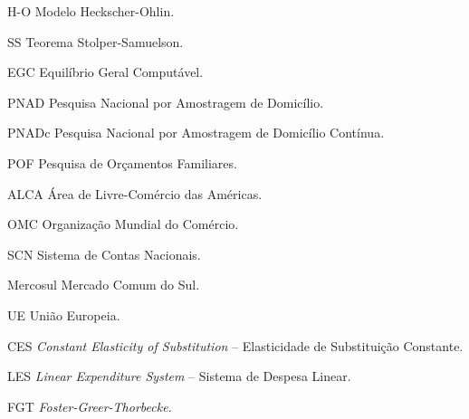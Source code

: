 

\listoffigures*
\cleardoublepage



\listofquadros*
\cleardoublepage



\listoftables*
\cleardoublepage



\begin{siglas}
	
	\item[H-O]      Modelo Heckscher-Ohlin.
	
	\item[SS]       Teorema Stolper-Samuelson.
	
	\item[EGC]      Equilíbrio Geral Computável.
	
	\item[PNAD]     Pesquisa Nacional por Amostragem de Domicílio.
	
	\item[PNADc]    Pesquisa Nacional por Amostragem de Domicílio Contínua.
	
	\item[POF]      Pesquisa de Orçamentos Familiares.
	
	\item[ALCA]     Área de Livre-Comércio das Américas.
	
	\item[OMC]      Organização Mundial do Comércio.
	
	\item[SCN]      Sistema de Contas Nacionais.
	
	\item[Mercosul] Mercado Comum do Sul.
	
	\item[UE]       União Europeia.
	
	\item[CES]      \textit{Constant Elasticity of Substitution} -- Elasticidade de Substituição Constante.
	
	\item[LES]      \textit{Linear Expenditure System} -- Sistema de Despesa Linear.
	
	\item[FGT]      \textit{Foster-Greer-Thorbecke}.
\end{siglas}


